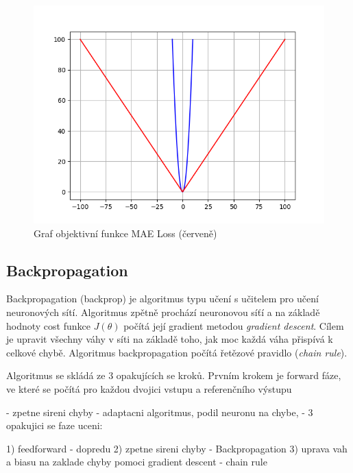 \begin{figure}[H]
    \centering
    \includegraphics[scale=0.4]{obrazky-figures/maeloss.png}
    \caption{\label{fig:maeloss}Graf objektivní funkce MAE Loss (červeně)}
\end{figure}



\subsection{Backpropagation}
Backpropagation (backprop) je algoritmus typu učení s učitelem pro učení neuronových sítí. Algoritmus zpětně prochází neuronovou síťí a na základě hodnoty cost funkce $J(\theta)$ počítá její gradient metodou \textit{gradient descent}. Cílem je upravit všechny váhy v síti na základě toho, jak moc každá váha přispívá k celkové chybě. Algoritmus backpropagation počítá řetězové pravidlo (\textit{chain rule}).

Algoritmus se skládá ze 3 opakujících se kroků. Prvním krokem je forward fáze, ve které se počítá pro každou dvojici vstupu a referenčního výstupu 


\cite{web-brilliant}
\cite[p~197]{deeplearning}


- zpetne sireni chyby
- adaptacni algoritmus, podil neuronu na chybe,
- 3 opakujici se faze uceni:

1) feedforward - dopredu
2) zpetne sireni chyby - Backpropagation
3) uprava vah a biasu na zaklade chyby pomoci gradient descent
- chain rule



